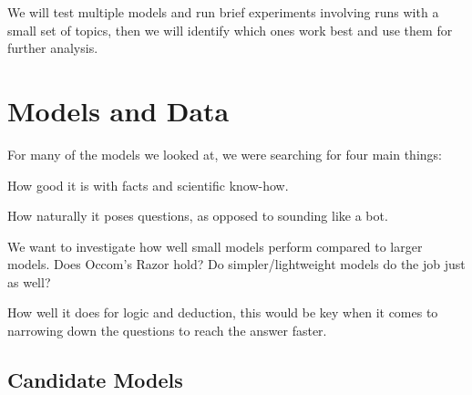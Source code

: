 \documentclass[10pt]{article}
\begin{document}
We will test multiple models and run brief experiments involving runs with a
small set of topics, then we will identify which ones work best and use them
for further analysis.

\section{Models and Data}

For many of the models we looked at, we were searching for four main things:

\begin{description}[leftmargin=2.2cm, style=nextline]
    \item[Knowledge:] How good it is with facts and scientific know-how.
    \item[Humanness:] How naturally it poses questions, as opposed to sounding
    like a bot.
    \item[Size:] We want to investigate how well small models perform compared
    to larger models. Does Occom's Razor hold? Do simpler/lightweight models do
    the job just as well?
    \item[Logic and Reasoning:] How well it does for logic and deduction, this
    would be key when it comes to narrowing down the questions to reach the
    answer faster.
\end{description}

\subsection*{Candidate Models}
\end{document}
